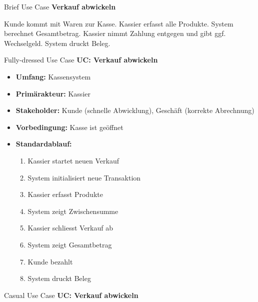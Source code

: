\begin{example2}{Brief Use Case}
\textbf{Verkauf abwickeln}

Kunde kommt mit Waren zur Kasse. Kassier erfasst alle Produkte. System berechnet Gesamtbetrag. Kassier nimmt Zahlung entgegen und gibt ggf. Wechselgeld. System druckt Beleg.
\end{example2}

\begin{example2}{Fully-dressed Use Case}
\textbf{UC: Verkauf abwickeln}
\begin{itemize}
    \item \textbf{Umfang:} Kassensystem
    \item \textbf{Primärakteur:} Kassier
    \item \textbf{Stakeholder:} Kunde (schnelle Abwicklung), Geschäft (korrekte Abrechnung)
    \item \textbf{Vorbedingung:} Kasse ist geöffnet
    \item \textbf{Standardablauf:}
    \begin{enumerate}
        \item Kassier startet neuen Verkauf
        \item System initialisiert neue Transaktion
        \item Kassier erfasst Produkte
        \item System zeigt Zwischensumme
        \item Kassier schliesst Verkauf ab
        \item System zeigt Gesamtbetrag
        \item Kunde bezahlt
        \item System druckt Beleg
    \end{enumerate}
\end{itemize}
\end{example2}

\begin{example2}{Casual Use Case}
\textbf{UC: Verkauf abwickeln}
\end{example2}


